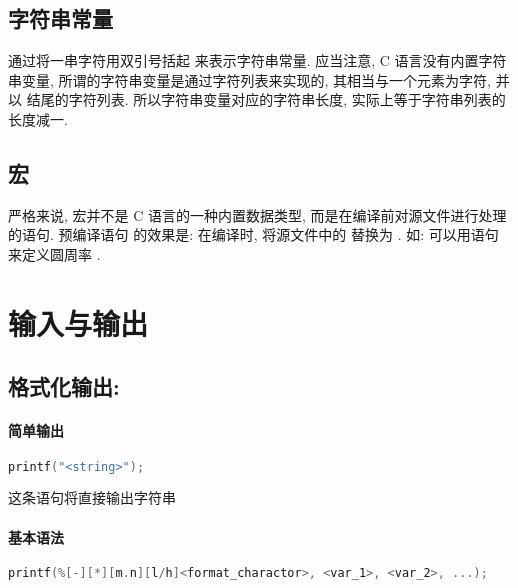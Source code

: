     \subsection{字符串常量}
        \hspace*{2em} 通过将一串字符用双引号括起  来表示字符串常量. 应当注意, C 语言没有内置字符串变量, 所谓的字符串变量是通过字符列表来实现的, 其相当与一个元素为字符, 并以  结尾的字符列表. 所以字符串变量对应的字符串长度, 实际上等于字符串列表的长度减一.

    \subsection{宏}
        \hspace*{2em} 严格来说, 宏并不是 C 语言的一种内置数据类型, 而是在编译前对源文件进行处理的语句. 预编译语句  的效果是: 在编译时, 将源文件中的  替换为 . 如: 可以用语句  来定义圆周率 .

\section{输入与输出}
    \subsection{格式化输出: }
        \paragraph{简单输出}
            \begin{lstlisting}[language = {C}, gobble = 16]
                printf("<string>");
            \end{lstlisting}
            这条语句将直接输出字符串 

        \paragraph{基本语法}
            \begin{lstlisting}[language = {C}, gobble = 16]
                printf(%[-][*][m.n][l/h]<format_charactor>, <var_1>, <var_2>, ...);
            \end{lstlisting}

